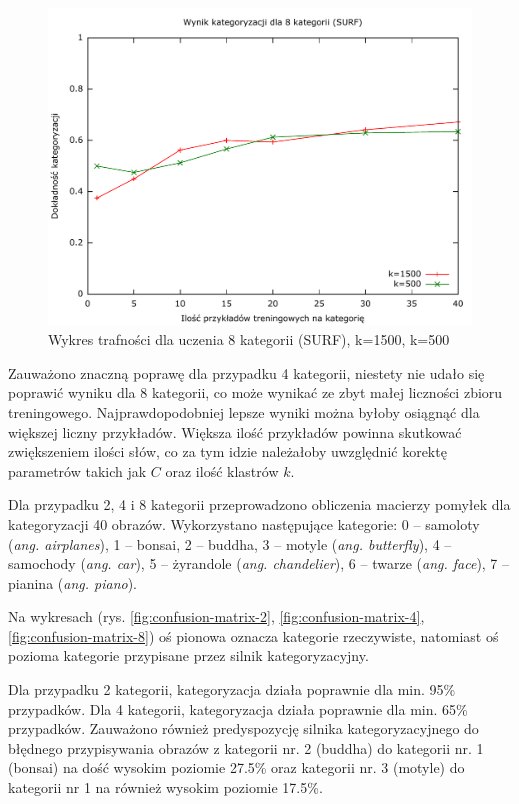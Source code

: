 \begin{figure}[h]
	\centering
	\includegraphics[scale=0.8]{graphics/04_interpretacja_wynikow/result-surf-8-1500-500.pdf}
	\caption{ Wykres trafności dla uczenia 8 kategorii (SURF), k=1500, k=500 }
	\label{fig:result-surf-8-1500-500}
\end{figure}

Zauważono znaczną poprawę dla przypadku 4 kategorii, niestety nie udało się poprawić wyniku dla 8 kategorii, co może wynikać ze zbyt małej liczności zbioru treningowego. Najprawdopodobniej lepsze wyniki można byłoby osiągnąć dla większej liczny przykładów. Większa ilość przykładów powinna skutkować zwiększeniem ilości słów, co za tym idzie należałoby uwzględnić korektę parametrów takich jak $C$ oraz ilość klastrów $k$.

Dla przypadku 2, 4 i 8 kategorii przeprowadzono obliczenia macierzy pomyłek dla kategoryzacji 40 obrazów. Wykorzystano następujące kategorie:
 0 -- samoloty (\emph{ang. airplanes}),
 1 -- bonsai,
 2 -- buddha,
 3 -- motyle (\emph{ang. butterfly}),
 4 -- samochody (\emph{ang. car}),
 5 -- żyrandole (\emph{ang. chandelier}),
 6 -- twarze (\emph{ang. face}),
 7 -- pianina (\emph{ang. piano}).

Na wykresach (rys. \ref{fig:confusion-matrix-2}, \ref{fig:confusion-matrix-4}, \ref{fig:confusion-matrix-8}) oś pionowa oznacza kategorie rzeczywiste, natomiast oś pozioma kategorie przypisane przez silnik kategoryzacyjny.

Dla przypadku 2 kategorii, kategoryzacja działa poprawnie dla min. 95\% przypadków. Dla 4 kategorii, kategoryzacja działa poprawnie dla min. 65\% przypadków. Zauważono również predyspozycję silnika kategoryzacyjnego do błędnego przypisywania obrazów z kategorii nr. 2 (buddha) do kategorii nr. 1 (bonsai) na dość wysokim poziomie 27.5\% oraz kategorii nr. 3 (motyle) do kategorii nr 1 na również wysokim poziomie 17.5\%.

